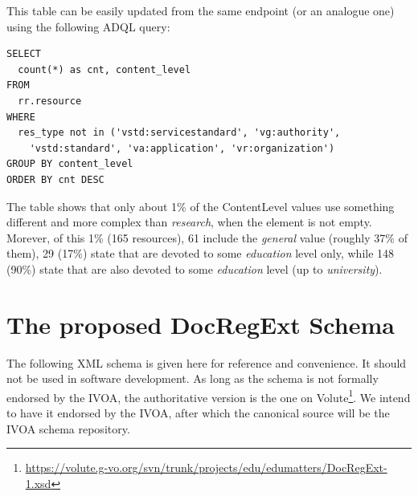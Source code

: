 \documentclass{ivoa}
\begin{document}
This table can be easily updated from the same endpoint (or an analogue 
one) using the following ADQL query:

\begin{verbatim}
SELECT 
  count(*) as cnt, content_level
FROM 
  rr.resource
WHERE
  res_type not in ('vstd:servicestandard', 'vg:authority', 
    'vstd:standard', 'va:application', 'vr:organization')
GROUP BY content_level
ORDER BY cnt DESC
\end{verbatim}

The table shows that only about 1\% of the ContentLevel values use 
something different and more complex than 
\emph{research}, when 
the element is not empty. Morever, of this 1\% (165 resources), 
61 include the \emph{general} value (roughly 37\% of them), 
29 (17\%) state that are devoted to some 
\emph{education} level only,
while 148 (90\%) state that are also devoted to some 
\emph{education} level (up to 
\emph{university}).


\section{The proposed DocRegExt Schema}

\label{app:schema}

The following XML schema is given here for reference and convenience.
It should not be used in software development.  As long as the schema is
not formally endorsed by the IVOA, the authoritative version is the one
on
Volute\footnote{\url{https://volute.g-vo.org/svn/trunk/projects/edu/edumatters/DocRegExt-1.xsd}}.
We intend to have it endorsed by the IVOA, after which the canonical
source will be the IVOA schema repository.




\end{document}
